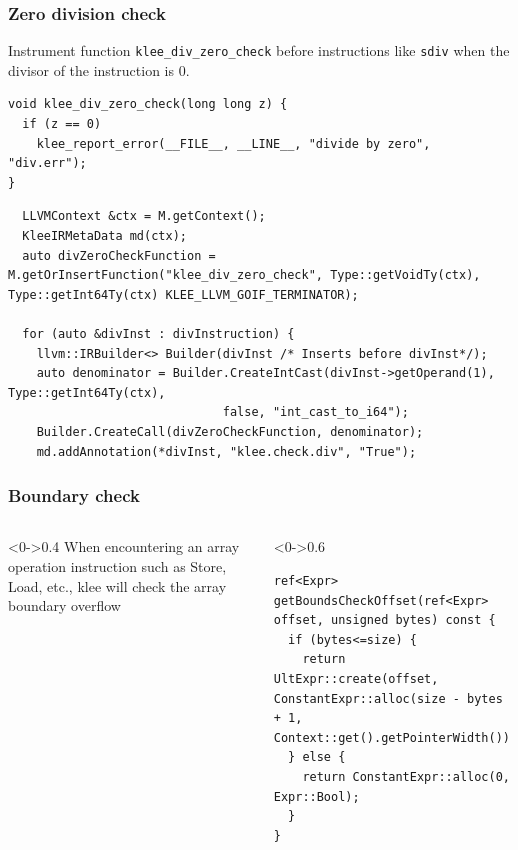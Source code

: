 \documentclass[9pt,aspectratio=43,mathserif,table]{beamer}
\begin{document}
\begin{frame}[fragile]
	\frametitle{Zero division check}

	Instrument function \verb|klee_div_zero_check| before instructions like \verb|sdiv| when the divisor of the instruction is 0.

	\begin{lstlisting}
void klee_div_zero_check(long long z) {
  if (z == 0)
    klee_report_error(__FILE__, __LINE__, "divide by zero", "div.err");
}
  \end{lstlisting}
	\begin{lstlisting}
  LLVMContext &ctx = M.getContext();
  KleeIRMetaData md(ctx);
  auto divZeroCheckFunction = M.getOrInsertFunction("klee_div_zero_check", Type::getVoidTy(ctx), Type::getInt64Ty(ctx) KLEE_LLVM_GOIF_TERMINATOR);

  for (auto &divInst : divInstruction) {
    llvm::IRBuilder<> Builder(divInst /* Inserts before divInst*/);
    auto denominator = Builder.CreateIntCast(divInst->getOperand(1), Type::getInt64Ty(ctx),
                              false, "int_cast_to_i64");
    Builder.CreateCall(divZeroCheckFunction, denominator);
    md.addAnnotation(*divInst, "klee.check.div", "True");
  \end{lstlisting}
\end{frame}

\begin{frame}[fragile]
	\frametitle{Boundary check}
	\begin{columns}[T]
		\begin{column}<0->{0.4\textwidth}
			When encountering an array operation instruction such as Store, Load, etc., klee will check the array boundary overflow
		\end{column}
		\hfill
		\begin{column}<0->{0.6\textwidth}
			\begin{lstlisting}
ref<Expr> getBoundsCheckOffset(ref<Expr> offset, unsigned bytes) const {
  if (bytes<=size) {
    return UltExpr::create(offset, ConstantExpr::alloc(size - bytes + 1, Context::get().getPointerWidth()));
  } else {
    return ConstantExpr::alloc(0, Expr::Bool);
  }
}
      \end{lstlisting}
		\end{column}
	\end{columns}


\end{frame}
\end{document}
